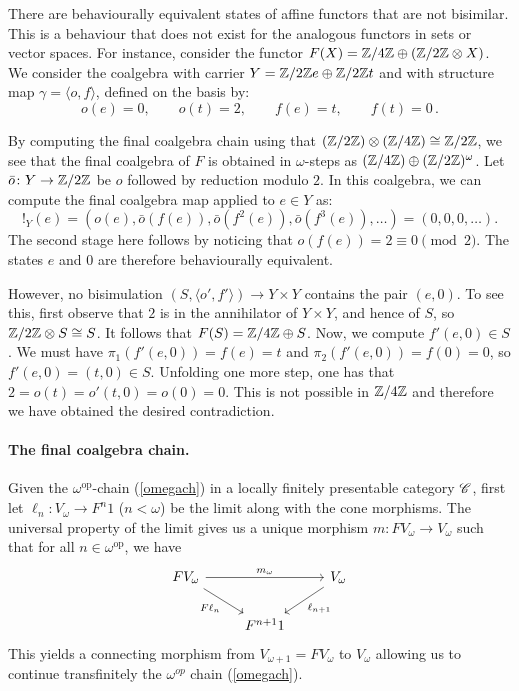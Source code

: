 \documentclass[runningheads]{llncs}
\begin{document}
\begin{example}
There are behaviourally equivalent states of affine functors that are not bisimilar. This is a behaviour that does not exist for the analogous functors in sets or vector spaces. For instance, consider the functor $F(X)= \mathbb{Z}/4\mathbb{Z} \oplus( \mathbb{Z}/2\mathbb{Z} \otimes X)$. We consider the coalgebra with carrier $Y = \mathbb{Z}/2\mathbb{Z} e \oplus \mathbb{Z}/ 2 \mathbb{Z} t$ and with structure map $\gamma = \langle o, f \rangle$, defined on the basis by:
\begin{equation*}
o(e) = 0, \qquad o(t) =2, \qquad f(e) = t, \qquad f(t) = 0 \, .
\end{equation*}

By computing the final coalgebra chain using that $(\mathbb{Z}/2\mathbb{Z} )\otimes (\mathbb{Z}/4\mathbb{Z} ) \cong \mathbb{Z}/2\mathbb{Z}$, we see that the final coalgebra of $F$ is obtained in $\omega$-steps as $(\mathbb{Z}/ 4\mathbb{Z}) \oplus (\mathbb{Z}/2 \mathbb{Z})^{\omega}$. 
Let $\bar o \colon Y \to \mathbb{Z} / 2 \mathbb{Z}$ be $o$ followed by reduction modulo $2$. 
In this coalgebra, we can compute the final coalgebra map applied to $e \in Y$ as:
\begin{equation*}
!_Y(e) = \left(o(e), \bar o(f(e)), \bar o(f^2(e)), \bar o(f^3(e)), \dots \right) = (0,0, 0, \dots).
\end{equation*}
The second stage here follows by noticing that $o(f(e)) = 2 \equiv 0 \pmod{2}$. The states $e$ and 0 are therefore behaviourally equivalent. 

However, no bisimulation $(S, \langle o', f' \rangle) \to Y \times Y$ contains the pair $(e, 0)$.
To see this, first observe that $2$ is in the annihilator of $Y \times Y$, and hence of $S$, so $\mathbb{Z} / 2 \mathbb{Z} \otimes S \cong S$.
It follows that $F(S) = \mathbb{Z} / 4 \mathbb{Z} \oplus S$.
Now, we compute $f'(e, 0) \in S$.
We must have $\pi_1(f'(e, 0)) = f(e) = t$ and $\pi_2(f'(e, 0)) = f(0) = 0$, so $f'(e, 0) = (t, 0) \in S$.
Unfolding one more step, one has that
$
2 = o(t) = o'(t, 0) = o(0) = 0.
$
This is not possible in $\mathbb{Z} / 4 \mathbb{Z}$ and therefore we have obtained the desired contradiction.
\end{example}



 
\paragraph*{The final coalgebra chain.}

Given the $\omega^{\mathrm{op}}$-chain (\ref{omegach}) in a locally finitely presentable category $\mathscr{C}$, first let $\ell_n \colon V_\omega \to F^n 1$ ($n < \omega$) be the limit along with the cone morphisms. The universal property of the limit gives us a unique morphism $m \colon F V_\omega \to V_\omega$ such that for all $n \in \omega^{\mathrm{op}}$, we have
\begin{equation}
\begin{tikzcd}
F V_\omega \arrow[rr, "m_{\omega}"] \arrow[dr, "F \ell_n"'] & & V_\omega \arrow[dl, "\ell_{n+1}"] \\
& F^{n+1} 1 & 
\end{tikzcd}
\end{equation}
This yields a connecting morphism from $V_{\omega+1} = F V_\omega$ to $V_\omega$ allowing us to continue  transfinitely the $\omega^{op}$ chain (\ref{omegach}).
\end{document}
